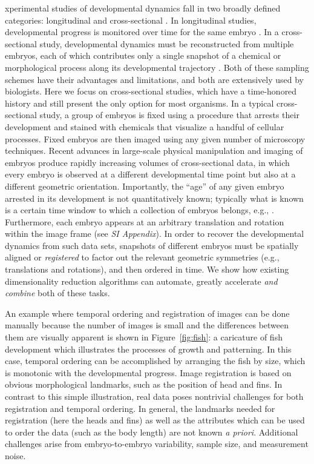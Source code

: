 \documentclass{pnastwo}
\begin{document}
\begin{article}
xperimental studies of developmental dynamics fall in two broadly defined categories: longitudinal and cross-sectional \cite{diggle2002analysis}.
%
In longitudinal studies, developmental progress is monitored over time for the same embryo \cite{roelens2013live, keller2013imaging}.
%
In a cross-sectional study, developmental dynamics must be reconstructed from multiple embryos, each of which contributes only a single snapshot of a chemical or morphological process along its developmental trajectory \cite{jaeger2004dynamic, fowlkes2008quantitative}.
%
Both of these sampling schemes have their advantages and limitations, and both are extensively used by biologists.
%
Here we focus on cross-sectional studies, which have a time-honored history and still present the only option for most organisms.
%
In a typical cross-sectional study, a group of embryos is fixed using a procedure that arrests their development and stained with chemicals that visualize a handful of cellular processes.
%
Fixed embryos are then imaged using any given number of microscopy techniques.
%
Recent advances in large-scale
physical manipulation and imaging of embryos produce rapidly increasing volumes of cross-sectional data, in which every embryo is observed at a different developmental time point but also at a different geometric orientation.
%
Importantly, the ``age'' of any given embryo arrested in its development is not quantitatively known; typically what is known is
a certain time window to which a collection of embryos belongs, e.g., \cite{ng2012large, richardson2014emage, castro2009automatic}.
%
Furthermore, each embryo appears at an arbitrary translation and rotation within the image frame (see {\it SI Appendix}).
%
In order to recover the developmental dynamics from such data sets, snapshots of different embryos must be spatially aligned or {\em registered} to factor out the relevant geometric symmetries (e.g., translations and rotations), and then ordered in time.
%
We show how existing dimensionality reduction algorithms can automate, greatly accelerate {\it and combine} both of these tasks.

An example where
temporal ordering and registration of images can be done manually
because the number of images is small and the differences between them are visually apparent is shown
in Figure~\ref{fig:fish}: a caricature of fish development which illustrates the processes of growth and patterning.
%
In this case, temporal ordering can be accomplished by arranging the fish by size, which is monotonic with the developmental progress.
%
Image registration is based on obvious morphological landmarks, such as the position of head and fins.
%
In contrast to this simple illustration, real data poses nontrivial challenges for both registration and temporal ordering.
%
In general, the landmarks needed for registration (here the heads and fins) as well as the attributes which can be used to order the data (such as the body length) are not known {\it a priori}.
%
Additional challenges arise from embryo-to-embryo variability, sample size, and measurement noise.


\end{article}
\end{document}
